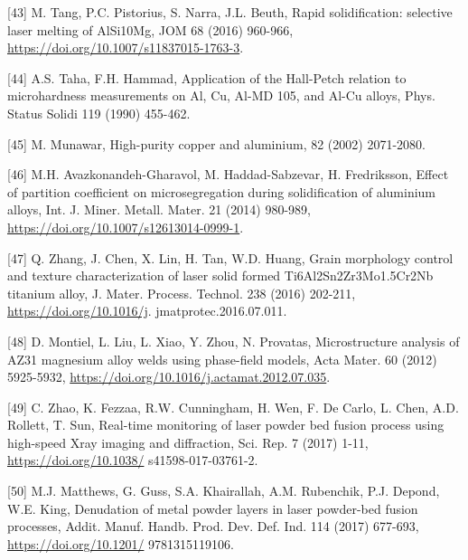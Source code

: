 \documentclass[10pt]{article}
\begin{document}
[43] M. Tang, P.C. Pistorius, S. Narra, J.L. Beuth, Rapid solidification: selective laser melting of AlSi10Mg, JOM 68 (2016) 960-966, \href{https://doi.org/10.1007/s11837015-1763-3}{https://doi.org/10.1007/s11837015-1763-3}.

[44] A.S. Taha, F.H. Hammad, Application of the Hall-Petch relation to microhardness measurements on Al, Cu, Al-MD 105, and Al-Cu alloys, Phys. Status Solidi 119 (1990) 455-462.

[45] M. Munawar, High-purity copper and aluminium, 82 (2002) 2071-2080.

[46] M.H. Avazkonandeh-Gharavol, M. Haddad-Sabzevar, H. Fredriksson, Effect of partition coefficient on microsegregation during solidification of aluminium alloys, Int. J. Miner. Metall. Mater. 21 (2014) 980-989, \href{https://doi.org/10.1007/s12613014-0999-1}{https://doi.org/10.1007/s12613014-0999-1}.

[47] Q. Zhang, J. Chen, X. Lin, H. Tan, W.D. Huang, Grain morphology control and texture characterization of laser solid formed Ti6Al2Sn2Zr3Mo1.5Cr2Nb titanium alloy, J. Mater. Process. Technol. 238 (2016) 202-211, \href{https://doi.org/10.1016/j}{https://doi.org/10.1016/j}. jmatprotec.2016.07.011.

[48] D. Montiel, L. Liu, L. Xiao, Y. Zhou, N. Provatas, Microstructure analysis of AZ31 magnesium alloy welds using phase-field models, Acta Mater. 60 (2012) 5925-5932, \href{https://doi.org/10.1016/j.actamat.2012.07.035}{https://doi.org/10.1016/j.actamat.2012.07.035}.

[49] C. Zhao, K. Fezzaa, R.W. Cunningham, H. Wen, F. De Carlo, L. Chen, A.D. Rollett, T. Sun, Real-time monitoring of laser powder bed fusion process using high-speed Xray imaging and diffraction, Sci. Rep. 7 (2017) 1-11, \href{https://doi.org/10.1038/}{https://doi.org/10.1038/} s41598-017-03761-2.

[50] M.J. Matthews, G. Guss, S.A. Khairallah, A.M. Rubenchik, P.J. Depond, W.E. King, Denudation of metal powder layers in laser powder-bed fusion processes, Addit. Manuf. Handb. Prod. Dev. Def. Ind. 114 (2017) 677-693, \href{https://doi.org/10.1201/}{https://doi.org/10.1201/} 9781315119106.
\end{document}
